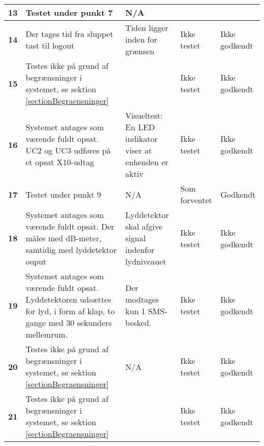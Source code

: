 \begin{center}
\begin{longtable}{|p{}|p{}|p{}|p{}|p{}|}
\textbf{13} &
Testet under punkt 7&
N/A &
 &
 \\\hline

\textbf{14} &
Der tages tid fra sluppet tast til logout&
Tiden ligger inden for grænsen
&Ikke \newline testet
&Ikke \newline godkendt 
 \\\hline

\textbf{15} &
Testes ikke på grund af begrænsninger i systemet, se sektion \ref{sectionBegraensninger}&
&Ikke \newline testet
&Ikke \newline godkendt 
 \\\hline

\textbf{16} &
Systemet antages som værende fuldt opsat.\newline
UC2 og UC3 udføres på et opsat X10-udtag&
Visueltest: En LED indikator viser at enhenden er aktiv
&Ikke \newline testet
&Ikke \newline godkendt 
 \\\hline

\textbf{17} &
Testet under punkt 9&
N/A
&Som \newline forventet
&Godkendt
 \\\hline

\textbf{18} &
Systemet antages som værende fuldt opsat.\newline
Der måles med dB-meter, samtidig med lyddetektor ouput&
Lyddetektor skal afgive signal indenfor lydniveauet
&Ikke \newline testet
&Ikke \newline godkendt 
 \\\hline

\textbf{19} &
Systemet antages som værende fuldt opsat.\newline
Lyddetektoren udsættes for lyd, i form af klap, to gange med 30 sekunders mellemrum.&
Der modtages kun 1 SMS-besked.
&Ikke \newline testet
&Ikke \newline godkendt 
 \\\hline

\textbf{20} &
Testes ikke på grund af begrænsninger i systemet, se sektion \ref{sectionBegraensninger}&
N/A 
&Ikke \newline testet
&Ikke \newline godkendt 
 \\\hline

\textbf{21} &
Testes ikke på grund af begrænsninger i systemet, se sektion \ref{sectionBegraensninger}&
&Ikke \newline testet
&Ikke \newline godkendt 
 \\\hline



	\end{longtable}
	\label{IKFUNK} 
\end{center}